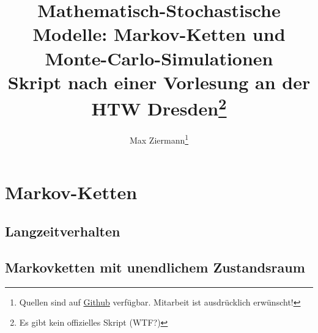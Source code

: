 \documentclass{report}
\title{%
\huge\textbf{Mathematisch-Stochastische Modelle: Markov-Ketten und Monte-Carlo-Simulationen} \\
[2em]\large Skript nach einer Vorlesung an der HTW Dresden\thanks{Es gibt kein
offizielles Skript (WTF?)}}
\author{Max Ziermann\thanks{Quellen sind auf \href{https://github.com/burrscurr/msm}
{Github} verfügbar. Mitarbeit ist ausdrücklich erwünscht!}}
\theoremstyle{lemmastyle}
\begin{document}
  \maketitle

  \tableofcontents

  
  
  

  \chapter{Markov-Ketten}
  
  \section{Langzeitverhalten}
  
  \section{Markovketten mit unendlichem Zustandsraum}
  

  \printbibliography
\end{document}
